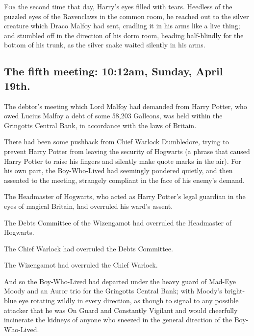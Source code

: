 

\lettrine{F}{or} the second 
time that day, Harry's eyes filled with tears. Heedless of the puzzled eyes of 
the Ravenclaws in the common room, he reached out to the silver creature which 
Draco Malfoy had sent, cradling it in his arms like a live thing; and stumbled 
off in the direction of his dorm room, heading half-blindly for the bottom of 
his trunk, as the silver snake waited silently in his arms.
\sbreak
\subsection{The fifth meeting: 10:12am, Sunday, April 19th.}

The debtor's meeting which Lord Malfoy had demanded from Harry Potter, who owed 
Lucius Malfoy a debt of some 58,203 Galleons, was held within the Gringotts 
Central Bank, in accordance with the laws of Britain.

There had been some pushback from Chief Warlock Dumbledore, trying to prevent 
Harry Potter from leaving the security of Hogwarts (a phrase that caused Harry 
Potter to raise his fingers and silently make quote marks in the air). For his 
own part, the Boy-Who-Lived had seemingly pondered quietly, and then assented 
to the meeting, strangely compliant in the face of his enemy's demand.

The Headmaster of Hogwarts, who acted as Harry Potter's legal guardian in the 
eyes of magical Britain, had overruled his ward's assent.

The Debts Committee of the Wizengamot had overruled the Headmaster of Hogwarts.

The Chief Warlock had overruled the Debts Committee.

The Wizengamot had overruled the Chief Warlock.

And so the Boy-Who-Lived had departed under the heavy guard of Mad-Eye Moody 
and an Auror trio for the Gringotts Central Bank; with Moody's bright-blue eye 
rotating wildly in every direction, as though to signal to any possible 
attacker that he was On Guard and Constantly Vigilant and would cheerfully 
incinerate the kidneys of anyone who sneezed in the general direction of the 
Boy-Who-Lived.

